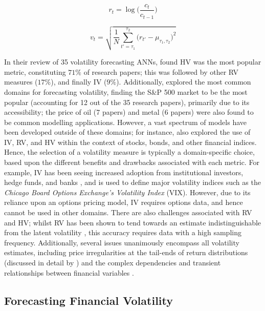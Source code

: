 \documentclass[a4paper, 11pt]{report}
\begin{document}
    \begin{equation}
        \label{eq: return}
        r_t = \log\Big(\frac{c_t}{c_{t-1}}\Big)
    \end{equation}

    \begin{equation}
        \label{eq: hv1}
        v_t = \sqrt{ \frac{1}{N} \sum_{t' = \tau_1}^{\tau_2} \big( r_{t'} - \mu_{\tau_1, \tau_2} \big)^2 }
    \end{equation}

    In their review of 35 volatility forecasting ANNs, \citet{ge-2022} found HV was the most popular metric, constituting $71\%$ of research papers; this was followed by other RV measures ($17\%$), and finally IV ($9\%$). Additionally, \citet{ge-2022} explored the most common domains for forecasting volatility, finding the S\&P 500 market to be the most popular (accounting for 12 out of the 35 research papers), primarily due to its accessibility; the price of oil (7 papers) and metal (6 papers) were also found to be common modelling applications. However, a vast spectrum of models have been developed outside of these domains; for instance, \citet{ge-2022} also explored the use of IV, RV, and HV within the context of stocks, bonds, and other financial indices. Hence, the selection of a volatility measure is typically a domain-specific choice, based upon the different benefits and drawbacks associated with each metric. For example, IV has been seeing increased adoption from institutional investors, hedge funds, and banks \citep{neftci-2008}, and is used to define major volatility indices such as the \emph{Chicago Board Options Exchange's Volatility Index} (VIX). However, due to its reliance upon an options pricing model, IV requires options data, and hence cannot be used in other domains. There are also challenges associated with RV and HV; whilst RV has been shown to tend towards an estimate indistinguishable from the latent volatility \citep{andersen-2001}, this accuracy requires data with a high sampling frequency. Additionally, several issues unanimously encompass all volatility estimates, including price irregularities at the tail-ends of return distributions (discussed in detail by \citet{ozbayoglu-2020}) and the complex dependencies and transient relationships between financial variables \citep{timmermann-2004}.


    \subsection{Forecasting Financial Volatility}
\end{document}
